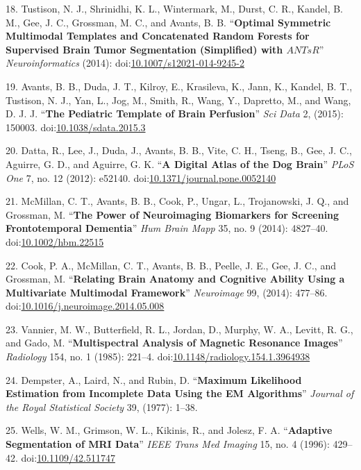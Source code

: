 \documentclass[11pt,]{article}
\begin{document}
18. Tustison, N. J., Shrinidhi, K. L., Wintermark, M., Durst, C. R.,
Kandel, B. M., Gee, J. C., Grossman, M. C., and Avants, B. B.
``\textbf{Optimal Symmetric Multimodal Templates and Concatenated Random
Forests for Supervised Brain Tumor Segmentation (Simplified) with
$ANTsR$}'' \emph{Neuroinformatics} (2014):
doi:\href{http://dx.doi.org/10.1007/s12021-014-9245-2}{10.1007/s12021-014-9245-2}

19. Avants, B. B., Duda, J. T., Kilroy, E., Krasileva, K., Jann, K.,
Kandel, B. T., Tustison, N. J., Yan, L., Jog, M., Smith, R., Wang, Y.,
Dapretto, M., and Wang, D. J. J. ``\textbf{The Pediatric Template of
Brain Perfusion}'' \emph{Sci Data} 2, (2015): 150003.
doi:\href{http://dx.doi.org/10.1038/sdata.2015.3}{10.1038/sdata.2015.3}

20. Datta, R., Lee, J., Duda, J., Avants, B. B., Vite, C. H., Tseng, B.,
Gee, J. C., Aguirre, G. D., and Aguirre, G. K. ``\textbf{A Digital Atlas
of the Dog Brain}'' \emph{PLoS One} 7, no. 12 (2012): e52140.
doi:\href{http://dx.doi.org/10.1371/journal.pone.0052140}{10.1371/journal.pone.0052140}

21. McMillan, C. T., Avants, B. B., Cook, P., Ungar, L., Trojanowski, J.
Q., and Grossman, M. ``\textbf{The Power of Neuroimaging Biomarkers for
Screening Frontotemporal Dementia}'' \emph{Hum Brain Mapp} 35, no. 9
(2014): 4827--40.
doi:\href{http://dx.doi.org/10.1002/hbm.22515}{10.1002/hbm.22515}

22. Cook, P. A., McMillan, C. T., Avants, B. B., Peelle, J. E., Gee, J.
C., and Grossman, M. ``\textbf{Relating Brain Anatomy and Cognitive
Ability Using a Multivariate Multimodal Framework}'' \emph{Neuroimage}
99, (2014): 477--86.
doi:\href{http://dx.doi.org/10.1016/j.neuroimage.2014.05.008}{10.1016/j.neuroimage.2014.05.008}

23. Vannier, M. W., Butterfield, R. L., Jordan, D., Murphy, W. A.,
Levitt, R. G., and Gado, M. ``\textbf{Multispectral Analysis of Magnetic
Resonance Images}'' \emph{Radiology} 154, no. 1 (1985): 221--4.
doi:\href{http://dx.doi.org/10.1148/radiology.154.1.3964938}{10.1148/radiology.154.1.3964938}

24. Dempster, A., Laird, N., and Rubin, D. ``\textbf{Maximum Likelihood
Estimation from Incomplete Data Using the EM Algorithms}'' \emph{Journal
of the Royal Statistical Society} 39, (1977): 1--38.

25. Wells, W. M., Grimson, W. L., Kikinis, R., and Jolesz, F. A.
``\textbf{Adaptive Segmentation of MRI Data}'' \emph{IEEE Trans Med
Imaging} 15, no. 4 (1996): 429--42.
doi:\href{http://dx.doi.org/10.1109/42.511747}{10.1109/42.511747}
\end{document}
